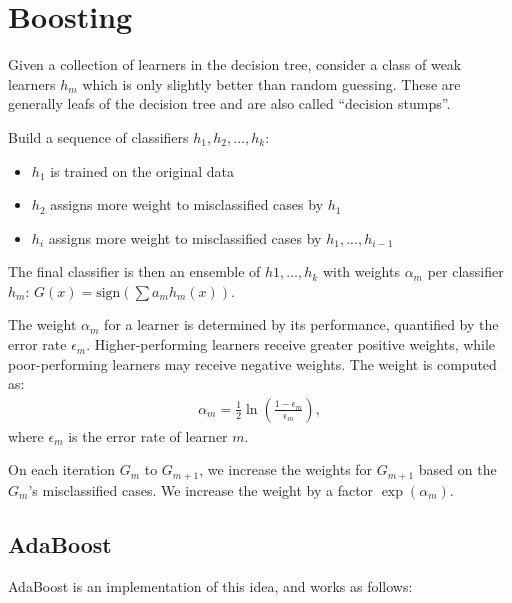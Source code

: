 \section{Boosting}

Given a collection of learners in the decision tree, consider
a class of weak learners $h_m$ which is only slightly better
than random guessing. These are generally leafs of the decision
tree and are also called ``decision stumps''.

Build a sequence of classifiers $h_1, h_2, ..., h_k$:
\begin{itemize}
  \item $h_1$ is trained on the original data
  \item $h_2$ assigns more weight to misclassified cases by $h_1$
  \item $h_i$ assigns more weight to misclassified cases by $h_1, ..., h_{i-1}$
\end{itemize}

The final classifier is then an ensemble of $h1,...,h_k$ with
weights $\alpha_m$ per classifier $h_m$:
$G(x) = \text{sign}(\sum a_m h_m(x))$.

\begin{definition}
  The weight $\alpha_m$ for a learner is determined by its performance,
  quantified by the error rate $\epsilon_m$. Higher-performing learners
  receive greater positive weights, while poor-performing learners may
  receive negative weights. The weight is computed as:
  \begin{align*}
    \alpha_m = \frac{1}{2} \ln \left( \frac{1 - \epsilon_m}{\epsilon_m} \right),
  \end{align*}
  where $\epsilon_m$ is the error rate of learner $m$.
\end{definition}

\begin{definition}
  On each iteration $G_m$ to $G_{m+1}$, we increase the weights
  for $G_{m+1}$ based on the $G_m$'s misclassified cases. We increase
  the weight by a factor $\exp(\alpha_m)$.
\end{definition}

\subsection{AdaBoost}

AdaBoost is an implementation of this idea, and works as follows:


